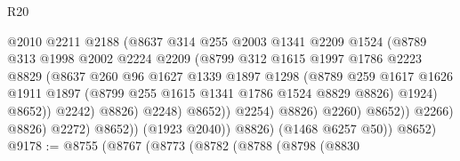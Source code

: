 \begin{lexlean}{R20}
\begin{coremodule}
                                      @2010
                                      @2211
                                      @2188
                                      (@8637
                                        @314
                                        @255
                                        @2003
                                        @1341
                                        @2209
                                        @1524
                                        (@8789
                                          @313
                                          @1998
                                          @2002
                                          @2224
                                          @2209
                                          (@8799
                                            @312
                                            @1615
                                            @1997
                                            @1786
                                            @2223
                                            @8829
                                            (@8637
                                              @260
                                              @96
                                              @1627
                                              @1339
                                              @1897
                                              @1298
                                              (@8789
                                                @259
                                                @1617
                                                @1626
                                                @1911
                                                @1897
                                                (@8799 @255 @1615 @1341 @1786 @1524 @8829 @8826)
                                                @1924)
                                              @8652))
                                          @2242)
                                        @8826)
                                      @2248)
                                    @8652))
                                @2254)
                              @8826)
                            @2260)
                          @8652))
                      @2266)
                    @8826)
                  @2272)
                @8652))
            (@1923 @2040))
          @8826)
        (@1468 @6257 @50))
      @8652)
@9178 := @8755
    (@8767
      (@8773
        (@8782
          (@8788
            (@8798
              (@8830

\end{coremodule}
\end{lexlean}
